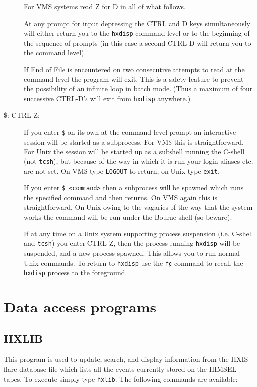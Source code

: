 \begin{description}
For VMS systems read Z for D in all of what follows.

At any prompt for input depressing the CTRL and D keys simultaneously
will either return you to the \verb!hxdisp! command level or to the
beginning of the sequence of prompts (in this case a second CTRL-D will
return you to the command level).

If End of File is encountered on two consecutive attempts to read at
the command level the program will exit. This is a safety feature to
prevent the possibility of an infinite loop in batch mode. (Thus a
maximum of four successive CTRL-D's will exit from \verb!hxdisp!
anywhere.)

\item[\$: CTRL-Z:] \label{dcl}

If you enter \verb!$! on its own at the command level prompt an
interactive session will be started as a subprocess. For VMS this is
straightforward. For Unix the session will be started up as a subshell
running the C-shell (not \verb!tcsh!), but because of the way in which
it is run your login aliases etc. are not set. On VMS type
\verb!LOGOUT! to return, on Unix type \verb!exit!.

If you enter \verb!$ <command>! then a subprocess will be spawned which
runs the specified command and then returns. On VMS again this is
straightforward. On Unix owing to the vagaries of the way that the
system works the command will be run under the Bourne shell (so beware).

If at any time on a Unix system supporting process suspension (i.e.
C-shell and \verb!tcsh!) you enter CTRL-Z, then the process running
\verb!hxdisp!  will be suspended, and a new process spawned. This
allows you to run normal Unix commands. To return to \verb!hxdisp! use
the \verb!fg!  command to recall the \verb!hxdisp! process to the
foreground.
\end{description}

\section{Data access programs}
      
\subsection{HXLIB}
\label{HXLIB}

This program is used to update, search, and display information from
the HXIS flare database file which lists all the events currently
stored on the HIMSEL tapes. To execute simply type \verb!hxlib!. The
following commands are available:

